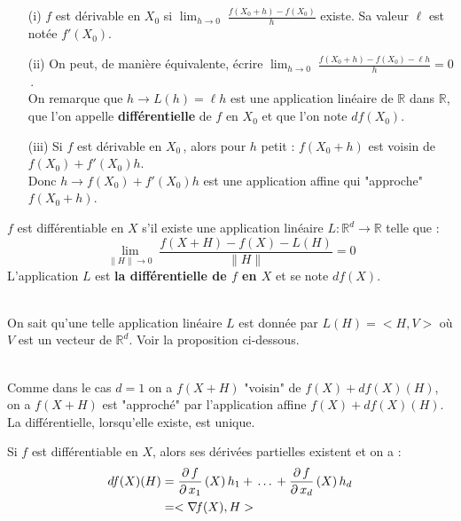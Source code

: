 \documentclass[class=report,crop=false]{standalone}
\begin{document}
{{\begin{enumerate}
\item[(i)] $f$ est dérivable en $X_{0}$ si $\displaystyle \lim_{h \rightarrow 0} \; \frac{f(X_{0} + h) - f(X_{0})}{h}$ existe.
Sa valeur $\ell$ est notée $f'(X_{0})$.  
\item[(ii)] On peut, de mani\`ere équivalente, écrire $\displaystyle \lim_{h \rightarrow 0} \; \frac{f(X_{0} + h) - f(X_{0}) - \ell h}{h} = 0$\,.\\
On remarque que $h \rightarrow L(h) = \ell h$ est une application linéaire de $\mathbb{R}$ dans $\mathbb{R}$, que l'on appelle {\bf différentielle} de $f$ en $X_{0}$ et que l'on note $df(X_{0})$.
\item[(iii)]  Si $f$ est dérivable en $X_{0}$\,, alors pour $h$ petit : $f(X_{0} + h)$ est voisin de $f(X_{0}) + f'(X_{0}) h$.\\
Donc $h \rightarrow f(X_{0}) + f'(X_{0}) h$ est une application affine qui "approche" $f(X_{0} + h)$.
\end{enumerate}






\begin{definition}
$f$ est différentiable en $X$ s'il existe une application linéaire $L : \mathbb{R}^d \rightarrow \mathbb{R}$ telle que :
$$\displaystyle \lim_{\|H\| \rightarrow 0} \; \frac{f(X + H) - f(X) - L(H)}{\|H\|} = 0$$
L'application $L$ est {\bf la différentielle de $f$ en $X$} et se note $df(X)$.
\end{definition}
\\
On sait qu'une telle application linéaire $L$ est donnée par $L(H)=<H,V>$ o\`u $V$ est un vecteur de $\mathbb R^d$. Voir la proposition ci-dessous.


\\
Comme dans le cas $d = 1$ on a $f(X + H)$ "voisin" de $f(X) + df(X)(H)$, on a $f(X + H)$ est "approché" par l'application affine $f(X) + df(X) (H)$.\\
La différentielle, lorsqu'elle existe, est unique.


\begin{proposition}
Si $f$ est différentiable en $X$, alors ses dérivées partielles existent et on a :
\begin{align}
df(X) ( H) & = \frac{\partial\,f}{\partial\,x_{1}}\,(X) \, h_{1} + \,\dots\, + \frac{\partial\,f}{\partial\,x_{d}}\,(X) \, h_{d} \notag\\
   & = <\nabla\hspace{-0.6mm} f(X) , H > \notag
 \end{align}
\end{proposition}

}}
\end{document}
